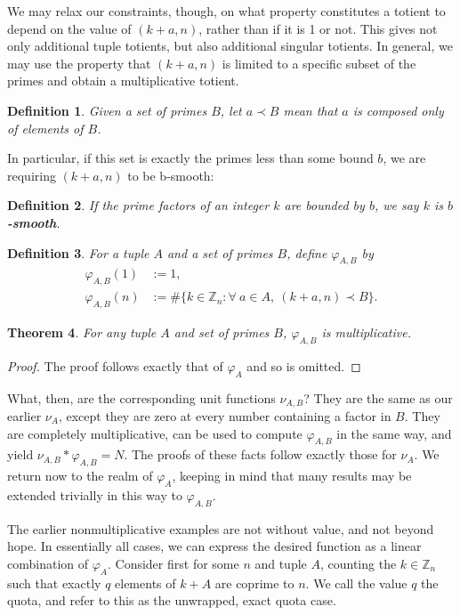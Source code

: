 \documentclass[11pt, leqno]{article}
\newtheorem{theorem}{Theorem}[section]
\newtheorem{definition}[theorem]{Definition}
\begin{document}
We may relax our constraints, though, on what property constitutes a totient
to depend on the value of $(k+a,n)$, rather than if it is 1 or not.
This gives not only additional tuple totients, but also
additional singular totients.
In general, we may use the property that $(k+a,n)$ is limited to
a specific subset of the primes and obtain a multiplicative totient.
\begin{definition}
    Given a set of primes $B$, let $a \prec B$ mean that $a$ is composed
    only of elements of $B$.
\end{definition}
In particular, if this set is exactly the primes less than some bound $b$,
we are requiring $(k+a,n)$ to be b-smooth:
\begin{definition}
    If the prime factors of an integer $k$ are bounded by $b$, we
    say $k$ is \textbf{$b$-smooth}.
\end{definition}
\begin{definition}
    For a tuple $A$ and a set of primes $B$,
    define $\varphi_{A,B}$ by
    \begin{align*}
        \varphi_{A,B}(1) &:= 1, \\
        \varphi_{A,B}(n) &:= \#\{k\in\mathbb{Z}_n : \forall\ a \in A,\
        (k+a,n) \prec B\}.
    \end{align*}
\end{definition}
\begin{theorem}\label{smooth totient mult}
    For any tuple $A$ and set of primes $B$,
    $\varphi_{A,B}$ is multiplicative.
\end{theorem}
\begin{proof}
    The proof follows exactly that of $\varphi_A$ and so
    is omitted.
\end{proof}

What, then, are the corresponding unit functions $\nu_{A,B}$?
They are the same as our earlier $\nu_A$, except
they are zero at every number containing a factor
in $B$. 
They are completely multiplicative, can be used to
compute $\varphi_{A,B}$ in the same way, and yield
$\nu_{A,B}\ast \varphi_{A,B} = N$.
The proofs of these facts follow exactly those for $\nu_A$.
We return now to the realm of $\varphi_A$, keeping in mind
that many results may be extended trivially in this way to 
$\varphi_{A,B}$.

The earlier nonmultiplicative examples are not without value,
and not beyond hope.
In essentially all cases, we can express the desired function
as a linear combination of $\varphi_A$. 
Consider first for some $n$ and tuple $A$, counting the $k\in\mathbb{Z}_n$
such that exactly $q$ elements of $k+A$ are coprime to $n$.
We call the value $q$ the quota, and refer to this as the unwrapped,
exact quota case.
\end{document}
